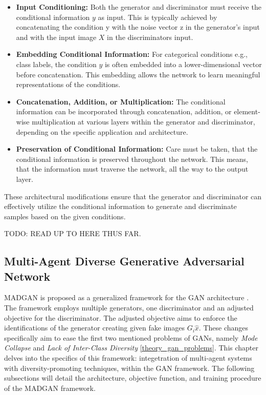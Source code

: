 \begin{itemize}
    \item \textbf{Input Conditioning:} Both the generator and discriminator must receive the conditional information \(y\) as input. This is typically achieved by concatenating the condition y with the noise vector z in the generator's input and with the input image \(X\) in the discriminators input.
    \item \textbf{Embedding Conditional Information:} For categorical conditions e.g., class labels, the condition \(y\) is often embedded into a lower-dimensional vector before concatenation. This embedding allows the network to learn meaningful representations of the conditions.
    \item \textbf{Concatenation, Addition, or Multiplication:} The conditional information can be incorporated through concatenation, addition, or element-wise multiplication at various layers within the generator and discriminator, depending on the specific application and architecture.
    \item \textbf{Preservation of Conditional Information:} Care must be taken, that the conditional information is preserved throughout the network. This means, that the information must traverse the network, all the way to the output layer.
\end{itemize}

\noindent
These architectural modifications ensure that the generator and discriminator can effectively utilize the conditional information to generate and discriminate samples based on the given conditions.

TODO: READ UP TO HERE THUS FAR.

\subsection[Multi-Agent Diverse Generative Adversarial Network - MADGAN]{Multi-Agent Diverse Generative Adversarial Network}
\label{theoretical_madgan}
MADGAN is proposed as a generalized framework for the GAN architecture \cite{ghosh2018madgan}. The framework employs multiple generators, one discriminator and an adjusted objective for the discriminator. The adjusted objective aims to enforce the identifications of the generator creating given fake images \(G_{i} \hat{x}\). These changes specifically aim to ease the first two mentioned problems of GANs, namely \textit{Mode Collapse} and \textit{Lack of Inter-Class Diversity} \ref{theory_gan_problems}. This chapter delves into the specifics of this framework: integetration of multi-agent systems with diversity-promoting techniques, within the GAN framework. The following subsections will detail the architecture, objective function, and training procedure of the MADGAN framework.

